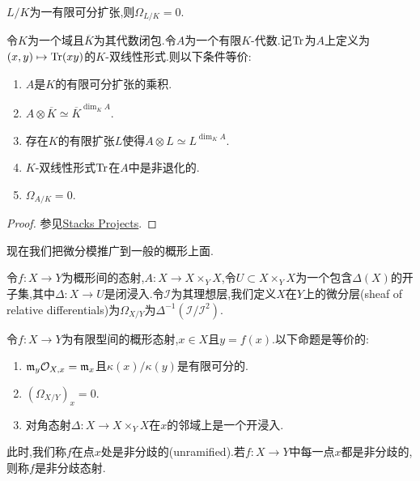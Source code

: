 \begin{corollary}\label{Cor:DifferentialModuleOfFiniteSeparable}
    $L/K$为一有限可分扩张,则$\Omega_{L/K}  =0$.
\end{corollary}
\begin{proposition}\label{Pro:Trace}
    令$K$为一个域且$\overline{K}$为其代数闭包.令$A$为一个有限$K$-代数.记$\operatorname{Tr}$为$A$上定义为$(x,y) \mapsto \operatorname{Tr}(xy)$的$K$-双线性形式.则以下条件等价:
    \begin{enumerate}
        \item $A$是$K$的有限可分扩张的乘积.
        \item $A \otimes \overline{K} \simeq \overline{K}^{\dim_K A}$.
        \item 存在$K$的有限扩张$L$使得$A \otimes L \simeq L^{\dim_K A}$.
        \item $K$-双线性形式$\operatorname{Tr}$在$A$中是非退化的.
        \item $\Omega_{A/K} = 0$.
    \end{enumerate}
\end{proposition}
\begin{proof}
    参见\href{https://stacks.math.columbia.edu/tag/00UV}{Stacks Projects}.
\end{proof}
现在我们把微分模推广到一般的概形上面.
\begin{definition}[微分层]
    令$f : X \to Y$为概形间的态射,$A : X \to X\times_Y X$,令$U \subset X \times_Y X$为一个包含$\Delta(X)$的开子集,其中$\Delta : X \to U$是闭浸入.令$\mathcal{I}$为其理想层,我们定义$X$在$Y$上的微分层(sheaf of relative differentials)为$\Omega_{X/Y}$为$\Delta^{-1} (\mathcal{I}/\mathcal{I}^2)$.
\end{definition}
\begin{definition-proposition}
    令$f : X \to Y$为有限型间的概形态射,$x \in X$且$y = f(x)$.以下命题是等价的:
    \begin{enumerate}
        \item $\mathfrak{m}_y\mathcal{O}_{X,x}=\mathfrak{m}_x$且$\kappa(x)/\kappa(y)$是有限可分的.
        \item $(\Omega_{X/Y})_x =0 $.
        \item 对角态射$\Delta : X \to X \times_Y X$在$x$的邻域上是一个开浸入.
    \end{enumerate}
    此时,我们称$f$在点$x$处是非分歧的(unramified).若$f : X \to Y$中每一点$x$都是非分歧的,则称$f$是非分歧态射.
\end{definition-proposition}
